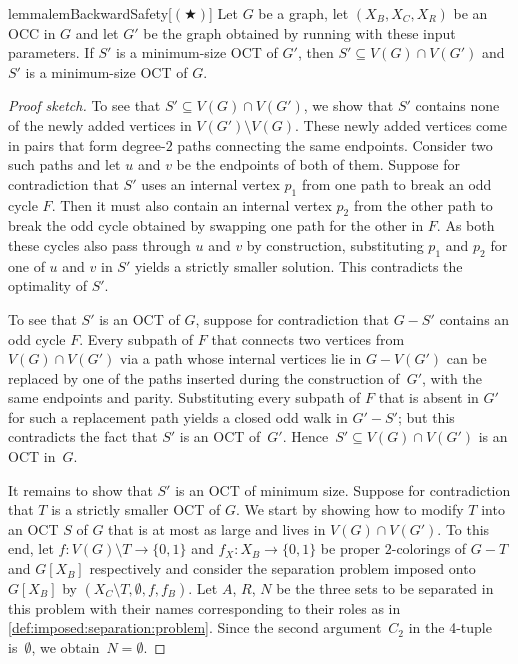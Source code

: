 \begin{restatable}{lemma}{lemBackwardSafety}[$(\bigstar)$]
\label{lem:backward:safety}
	Let $G$ be a graph, let $(X_B, X_C, X_R)$ be an OCC in $G$ and let $G'$ be the graph obtained by running  with these input parameters. If $S'$ is a minimum-size OCT of $G'$, then $S' \subseteq V(G) \cap V(G')$ and $S'$ is a minimum-size OCT of $G$.
\end{restatable}
\begin{proof}[Proof sketch]
	To see that $S' \subseteq V(G) \cap V(G')$, we show that $S'$ contains none of the newly added vertices in $V(G') \setminus V(G)$. These newly added vertices come in pairs that form degree-$2$ paths connecting the same endpoints. Consider two such paths and let $u$ and $v$ be the endpoints of both of them. Suppose for contradiction that $S'$ uses an internal vertex $p_1$ from one path to break an odd cycle $F$. Then it must also contain an internal vertex $p_2$ from the other path to break the odd cycle obtained by swapping one path for the other in $F$. As both these cycles also pass through $u$ and $v$ by construction, substituting $p_1$ and $p_2$ for one of $u$ and $v$ in $S'$ yields a strictly smaller solution. This contradicts the optimality of $S'$.
	
	To see that $S'$ is an OCT of $G$, suppose for contradiction that $G - S'$ contains an odd cycle $F$. Every subpath of $F$ that connects two vertices from $V(G) \cap V(G')$ via a path whose internal vertices lie in $G - V(G')$ can be replaced by one of the paths inserted during the construction of~$G'$, with the same endpoints and parity. Substituting every subpath of $F$ that is absent in $G'$ for such a replacement path yields a closed odd walk in $G' - S'$; but this contradicts the fact that $S'$ is an OCT of~$G'$. Hence~$S' \subseteq V(G) \cap V(G')$ is an OCT in~$G$.
	
	It remains to show that $S'$ is an OCT of minimum size. Suppose for contradiction that $T$ is a strictly smaller OCT of $G$. We start by showing how to modify $T$ into an OCT $S$ of $G$ that is at most as large and lives in $V(G) \cap V(G')$. 
%	
	To this end, let $f \colon V(G) \setminus T \rightarrow \{0,1\}$ and $f_X \colon X_B \rightarrow \{0,1\}$ be proper $2$-colorings of $G - T$ and $G[X_B]$ respectively and consider the separation problem imposed onto $G[X_B]$ by $(X_C \setminus T, \emptyset, f, f_B)$. Let $A$, $R$, $N$ be the three sets to be separated in this problem with their names corresponding to their roles as in \cref{def:imposed:separation:problem}. Since the second argument~$C_2$ in the 4-tuple is~$\emptyset$, we obtain~$N = \emptyset$.
	

\end{proof}
